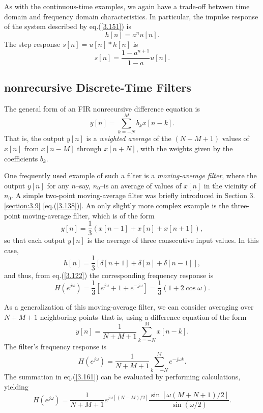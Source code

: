 \documentclass[a4paper,twoside]{book}
\begin{document}
As with the continuous-time examples, we again have a trade-off between time domain and frequency domain characteristics. In particular, the impulse response of the system described by eq.\;(\ref{3.151}) is
\begin{equation}
    h[n]=a^nu[n].
    \label{3.155}
\end{equation}
The step response $s[n]=u[n]*h[n]$ is
\begin{equation}
    s[n]=\frac{1-a^{n+1}}{1-a}u[n].
    \label{3.156}
\end{equation}

\subsection{nonrecursive Discrete-Time Filters}

The general form of an FIR nonrecursive difference equation is
\begin{equation}
    y[n]=\sum_{k=-N}^Mb_kx[n-k].
    \label{3.157}
\end{equation}
That is, the output $y[n]$ is a \textit{weighted average} of the $(N+M+1)$ values of $x[n]$ from $x[n-M]$ through $x[n+N]$, with the weights given by the coefficients $b_k$.

One frequently used example of such a filter is a \textit{moving-average filter}, where the output $y[n]$ for any $n$--say, $n_0$--is an average of values of $x[n]$ in the vicinity of $n_0$. A simple two-point moving-average filter was briefly introduced in Section 3.\ref{section:3.9} [eq.\;(\ref{3.138})]. An only slightly more complex example is the three-point moving-average filter, which is of the form
\begin{equation}
    y[n]=\frac13(x[n-1]+x[n]+x[n+1]),
    \label{3.158}
\end{equation}
so that each output $y[n]$ is the average of three consecutive input values. In this case, $$h[n]=\frac13[\delta[n+1]+\delta[n]+\delta[n-1]],$$ and thus, from eq.\;(\ref{3.122}) the corresponding frequency response is
\begin{equation}
    H(e^{j\omega})=\frac13[e^{j\omega}+1+e^{-j\omega}]=\frac13(1+2\cos\omega).
    \label{3.159}
\end{equation}

As a generalization of this moving-average filter, we can consider averaging over $N+M+1$ neighboring points--that is, using a difference equation of the form
\begin{equation}
    y[n]=\frac1{N+M+1}\sum_{k=-N}^Mx[n-k].
    \label{3.160}
\end{equation}
The filter's frequency response is
\begin{equation}
    H(e^{j\omega})=\frac1{N+M+1}\sum_{k=-N}^Me^{-j\omega k}.
    \label{3.161}
\end{equation}
The summation in eq.\;(\ref{3.161}) can be evaluated by performing calculations, yielding
\begin{equation}
    H(e^{j\omega})=\frac1{N+M+1}e^{j\omega[(N-M)/2]}\frac{\sin[\omega(M+N+1)/2]}{\sin(\omega/2)}.
    \label{3.162}
\end{equation}
\end{document}
